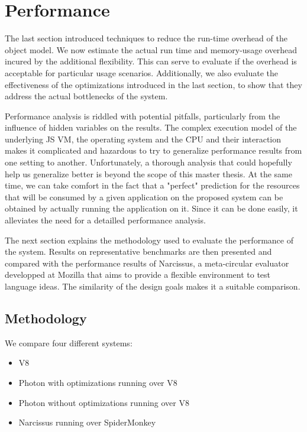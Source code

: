\chapter{Performance}
\label{chap:Performance}

The last section introduced techniques to reduce the run-time overhead of the
object model. We now estimate the actual run time and memory-usage
overhead incured by the additional flexibility. This can serve to
evaluate if the overhead is acceptable for particular usage scenarios.
Additionally, we also evaluate the effectiveness of the optimizations
introduced in the last section, to show that they address the actual
bottlenecks of the system.

Performance analysis is riddled with potential pitfalls, particularly from the
influence of hidden variables on the results. The complex execution model of
the underlying JS VM, the operating system and the CPU and their interaction
makes it complicated and hazardous to try to generalize performance results
from one setting to another.  Unfortunately, a thorough analysis that could
hopefully help us generalize better is beyond the scope of this master thesis.
At the same time, we can take comfort in the fact that a "perfect" prediction
for the resources that will be consumed by a given application on the proposed
system can be obtained by actually running the application on it. Since it can
be done easily, it alleviates the need for a detailled performance analysis.

The next section explains the methodology used to evaluate the performance of
the system. Results on representative benchmarks are then presented and
compared with the performance results of Narcissus, a meta-circular evaluator
developped at Mozilla that aims to provide a flexible environment to test
language ideas. The similarity of the design goals makes it a suitable
comparison.

\section{Methodology}

We compare four different systems:
\begin{itemize}
    \item V8
    \item Photon with optimizations running over V8
    \item Photon without optimizations running over V8
    \item Narcissus running over SpiderMonkey
\end{itemize}

